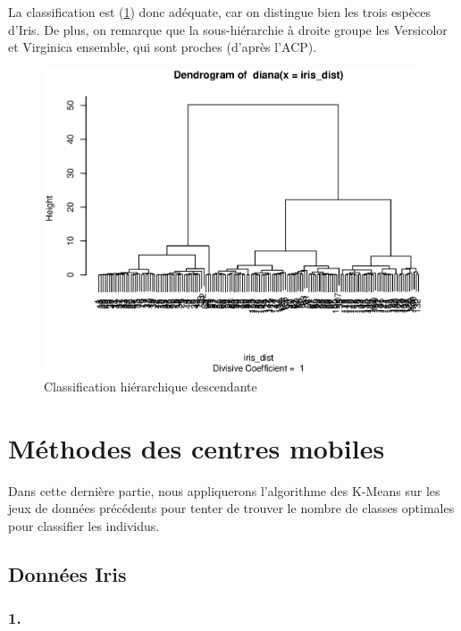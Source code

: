 \documentclass{article}
\begin{document}
La classification est (\ref{iris_cdh}) donc adéquate, car on distingue bien les trois espèces d'Iris. De plus, on remarque que la sous-hiérarchie à droite groupe les Versicolor et Virginica ensemble, qui sont proches (d'après l'ACP).
\begin{figure}[H]
\centering
\includegraphics[scale=0.5]{./img/iris_cdh.eps}
\caption{Classification hiérarchique descendante}
\label{iris_cdh}
\end{figure}



\section{Méthodes des centres mobiles}

Dans cette dernière partie, nous appliquerons l'algorithme des K-Means sur les jeux de données précédents pour tenter de trouver le nombre de classes optimales pour classifier les individus.

\subsection{Données Iris}

\subsubsection*{1.}
\end{document}
